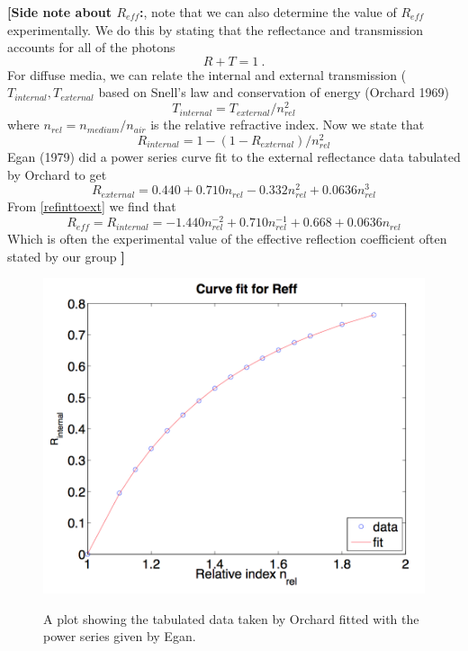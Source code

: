 \vspace{3mm}
{\bf [Side note about $R_{eff}$:}, note that we can also determine
the value of $R_{eff}$ experimentally. We do this by stating that the
reflectance and transmission accounts for all of the photons
\begin{equation}
  R + T = 1 \ .
\end{equation}
For diffuse media, we can relate the internal and external transmission ($T_{internal}, T_{external}$ based on Snell's law and
conservation of energy (Orchard 1969)
\begin{equation}
  T_{internal} = T_{external} /n_{rel}^2
\end{equation}
where $n_{rel} = n_{medium}/n_{air}$ is the relative refractive
index. Now we state that
\begin{equation}
\label{refinttoext}
R_{internal} = 1 - (1 - R_{external})/n_{rel}^2
\end{equation}
Egan (1979) \cite{Egan1979} did a power series curve fit to the external reflectance data tabulated by Orchard \cite{Orchard1969} to get
\begin{equation}
R_{external} = 0.440 + 0.710n_{rel} -0.332n_{rel}^2 + 0.0636n_{rel}^3
\end{equation}
From \ref{refinttoext} we find that \cite{Sevick2002}
\begin{equation}
\label{exp eff}
R_{eff} = R_{internal} = -1.440n_{rel}^{-2} + 0.710n_{rel}^{-1} + 0.668 + 0.0636n_{rel}
\end{equation}
Which is often the experimental value of the effective reflection coefficient often stated by our group {\bf ]}
\begin{figure}[h]
  \begin{center}
    \includegraphics[scale=0.44]{./figures/ReflectanceCurveFit.png}
    \label{ReflectanceCurveFit}
    \caption{A plot showing the tabulated data taken by Orchard fitted with the power series given by Egan.} 
  \end{center}
\end{figure}




